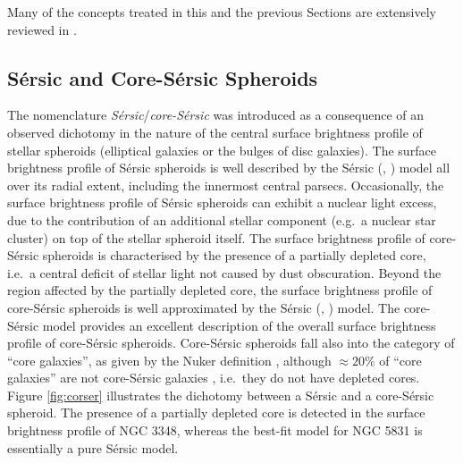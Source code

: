 Many of the concepts treated in this and the previous Sections 
are extensively reviewed in \cite{graham2016bulges}.

\subsection{S\'ersic and Core-S\'ersic Spheroids} 
\label{sec:corser}
The nomenclature \emph{S\'ersic}/\emph{core-S\'ersic} was introduced as a consequence of an observed dichotomy 
in the nature of the central surface brightness profile of stellar spheroids (elliptical galaxies or the bulges of disc galaxies). 
The surface brightness profile of S\'ersic spheroids is well described by the S\'ersic (\citeyear{sersic1963}, \citeyear{sersic1968}) model 
all over its radial extent, including the innermost central parsecs. 
Occasionally, the surface brightness profile of S\'ersic spheroids can exhibit a nuclear light excess, 
due to the contribution of an additional stellar component (e.g.~a nuclear star cluster) on top of the stellar spheroid itself. 
The surface brightness profile of core-S\'ersic spheroids is characterised by the presence of a partially depleted core, 
i.e.~a central deficit of stellar light not caused by dust obscuration. 
Beyond the region affected by the partially depleted core, 
the surface brightness profile of core-S\'ersic spheroids is well approximated by the S\'ersic (\citeyear{sersic1963}, \citeyear{sersic1968}) model. 
The core-S\'ersic model \citep{graham2003coresersicmodel,trujillo2004coresersicmodel} provides an excellent description 
of the overall surface brightness profile of core-S\'ersic spheroids. 
Core-S\'ersic spheroids fall also into the category of ``core galaxies'', as given by the Nuker definition \citep{lauer2007}, 
although $\approx 20\%$ of ``core galaxies'' are not core-S\'ersic galaxies \citep{dullograham2014cores}, 
i.e.~they do not have depleted cores.
Figure \ref{fig:corser} illustrates the dichotomy between a S\'ersic and a core-S\'ersic spheroid. 
The presence of a partially depleted core is detected in the surface brightness profile of NGC 3348, 
whereas the best-fit model for NGC 5831 is essentially a pure S\'ersic model. \\

